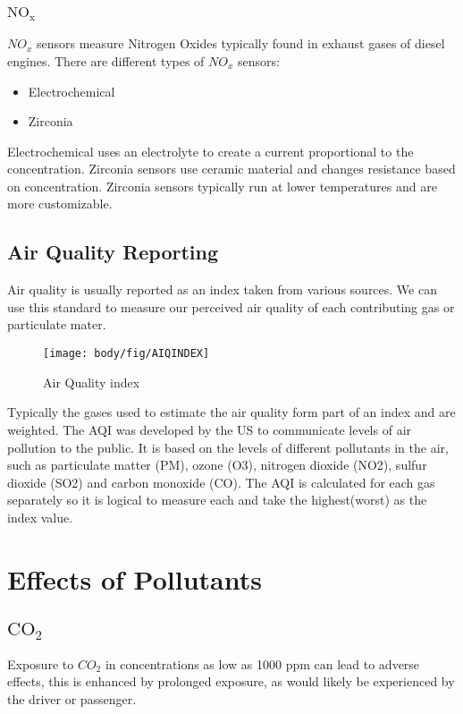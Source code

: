 \subsubsection{$\mathrm{NO_x}$}
${NO_x}$ sensors measure Nitrogen Oxides typically found in exhaust gases of diesel engines\cite{autolintec:noxsensor}. There are different types of ${NO_x}$ sensors\cite{drivearchive:noxsensor}:
\begin{itemize}
	\item Electrochemical
	\item Zirconia
\end{itemize}
Electrochemical uses an electrolyte to create a current proportional to the concentration.
Zirconia sensors use ceramic material and changes resistance based on concentration.
Zirconia sensors typically run at lower temperatures and are more customizable.\cite{miura2006electrochemical}


\subsection{Air Quality Reporting}
Air quality is usually reported as an index taken from various sources. We can use this standard to measure our perceived air quality of each contributing gas or particulate mater. \cite{airqualit:index} 

\begin{figure}[!htb]
	\centering
	\texttt{[image: body/fig/AIQINDEX]}
	\caption{Air Quality index \cite{GreenEcon2}}
	\label{fig:index}
\end{figure}

\noindent
Typically the gases used to estimate the air quality form part of an index and are weighted. The AQI was developed by the US to communicate levels of air pollution to the public\cite{Airly}.  It is based on the levels of different pollutants in the air, such as particulate matter (PM), ozone (O3), nitrogen dioxide (NO2), sulfur dioxide (SO2) and carbon monoxide (CO). The AQI is calculated for each gas separately so it is logical to measure each and take the highest(worst) as the index value.\cite{worldairqualityranking}

\pagebreak
\section{Effects of Pollutants}
\subsection{$\mathrm{CO_2}$}
Exposure to $CO_2$ in concentrations as low as 1000 ppm can lead to adverse effects\cite{healthrisksco2}, this is enhanced by prolonged exposure, as would likely be experienced by the driver or passenger. 

